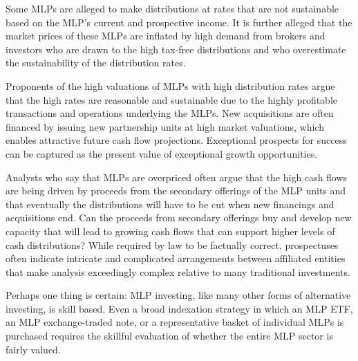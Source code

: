 \documentclass[11pt]{article}
\begin{document}
Some MLPs are alleged to make distributions at rates that are not sustainable based on the MLP's current and prospective income. It is further alleged that the market prices of these MLPs are inflated by high demand from brokers and investors who are drawn to the high tax-free distributions and who overestimate the sustainability of the distribution rates.

Proponents of the high valuations of MLPs with high distribution rates argue that the high rates are reasonable and sustainable due to the highly profitable transactions and operations underlying the MLPs. New acquisitions are often financed by issuing new partnership units at high market valuations, which enables attractive future cash flow projections. Exceptional prospects for success can be captured as the present value of exceptional growth opportunities.

Analysts who say that MLPs are overpriced often argue that the high cash flows are being driven by proceeds from the secondary offerings of the MLP units and that eventually the distributions will have to be cut when new financings and acquisitions end. Can the proceeds from secondary offerings buy and develop new capacity that will lead to growing cash flows that can support higher levels of cash distributions? While required by law to be factually correct, prospectuses often indicate intricate and complicated arrangements between affiliated entities that make analysis exceedingly complex relative to many traditional investments.

Perhaps one thing is certain: MLP investing, like many other forms of alternative investing, is skill based. Even a broad indexation strategy in which an MLP ETF, an MLP exchange-traded note, or a representative basket of individual MLPs is purchased requires the skillful evaluation of whether the entire MLP sector is fairly valued.
\end{document}
